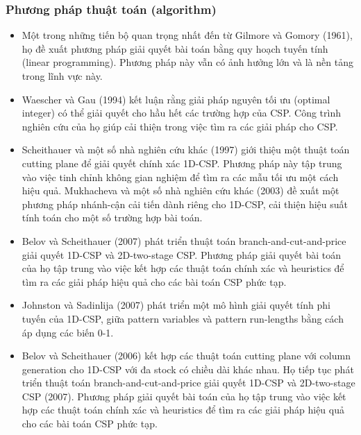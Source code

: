 \documentclass[a4paper]{article}
\begin{document}
\subsubsection{Phương pháp thuật toán (algorithm)}
\begin{itemize}[itemsep=1.5pt, parsep=1.5pt]
    \item Một trong những tiến bộ quan trọng nhất đến từ Gilmore và Gomory (1961), họ đề xuất phương pháp giải quyết bài toán bằng quy hoạch tuyến tính (linear programming). Phương pháp này vẫn có ảnh hưởng lớn và là nền tảng trong lĩnh vực này.
    \item Waescher và Gau (1994) kết luận rằng giải pháp nguyên tối ưu (optimal integer) có thể giải quyết cho hầu hết các trường hợp của CSP. Công trình nghiên cứu của họ giúp cải thiện trong việc tìm ra các giải pháp cho CSP.
    \item Scheithauer và một số nhà nghiên cứu khác (1997) giới thiệu một thuật toán cutting plane để giải quyết chính xác 1D-CSP. Phương pháp này tập trung vào việc tinh chỉnh không gian nghiệm để tìm ra các mẫu tối ưu một cách hiệu quả. Mukhacheva và một số nhà nghiên cứu khác (2003) đề xuất một phương pháp nhánh-cận cải tiến dành riêng cho 1D-CSP, cải thiện hiệu suất tính toán cho một số trường hợp bài toán.
    \item Belov và Scheithauer (2007) phát triển thuật toán branch-and-cut-and-price giải quyết 1D-CSP và 2D-two-stage CSP. Phương pháp giải quyết bài toán của họ tập trung vào việc kết hợp các thuật toán chính xác và heuristics để tìm ra các giải pháp hiệu quả cho các bài toán CSP phức tạp. 
    \item Johnston và Sadinlija (2007) phát triển một mô hình giải quyết tính phi tuyến của 1D-CSP, giữa pattern variables và pattern run-lengths bằng cách áp dụng các biến 0-1. 
    \item Belov và Scheithauer (2006) kết hợp các thuật toán cutting plane với column generation cho 1D-CSP với đa stock có chiều dài khác nhau. Họ tiếp tục phát triển thuật toán branch-and-cut-and-price giải quyết 1D-CSP và 2D-two-stage CSP (2007). Phương pháp giải quyết bài toán của họ tập trung vào việc kết hợp các thuật toán chính xác và heuristics để tìm ra các giải pháp hiệu quả cho các bài toán CSP phức tạp.
\end{itemize}
\end{document}
